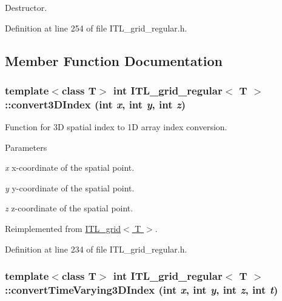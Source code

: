Destructor. 



Definition at line 254 of file ITL\_\-grid\_\-regular.h.



\subsection{Member Function Documentation}
\hypertarget{classITL__grid__regular_a9561a0c36a74216eef9685d5f3369f7a}{
\subsubsection[{convert3DIndex}]{\setlength{\rightskip}{0pt plus 5cm}template$<$class T$>$ int {\bf ITL\_\-grid\_\-regular}$<$ T $>$::convert3DIndex (int {\em x}, \/  int {\em y}, \/  int {\em z})}}
\label{classITL__grid__regular_a9561a0c36a74216eef9685d5f3369f7a}


Function for 3D spatial index to 1D array index conversion. 


\begin{DoxyParams}{Parameters}
\item[{\em x}]x-\/coordinate of the spatial point. \item[{\em y}]y-\/coordinate of the spatial point. \item[{\em z}]z-\/coordinate of the spatial point. \end{DoxyParams}


Reimplemented from \hyperlink{classITL__grid_a2a1731cce0351121768b5a104e601057}{ITL\_\-grid$<$ T $>$}.



Definition at line 234 of file ITL\_\-grid\_\-regular.h.

\hypertarget{classITL__grid__regular_a6172df2903ce28b33f158ccaa3741774}{
\subsubsection[{convertTimeVarying3DIndex}]{\setlength{\rightskip}{0pt plus 5cm}template$<$class T$>$ int {\bf ITL\_\-grid\_\-regular}$<$ T $>$::convertTimeVarying3DIndex (int {\em x}, \/  int {\em y}, \/  int {\em z}, \/  int {\em t})}}
\label{classITL__grid__regular_a6172df2903ce28b33f158ccaa3741774}



